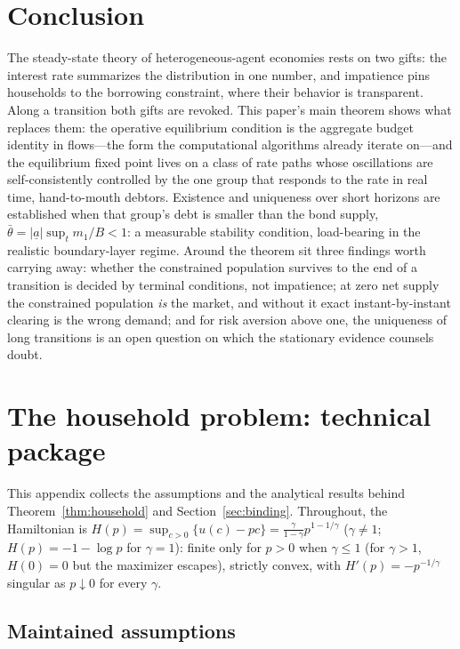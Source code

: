 \documentclass[11pt]{article}
\theoremstyle{definition}
\theoremstyle{remark}
\newcommand{\ubar}[1]{\underline{#1}}
\newcommand{\uba}{\ubar{a}}
\begin{document}
\section{Conclusion}
\label{sec:conclusion}

The steady-state theory of heterogeneous-agent economies rests on two
gifts: the interest rate summarizes the distribution in one number,
and impatience pins households to the borrowing constraint, where
their behavior is transparent. Along a transition both gifts are
revoked. This paper's main theorem shows what replaces them: the
operative equilibrium condition is the aggregate budget identity in
flows---the form the computational algorithms already iterate
on---and the equilibrium fixed point lives on a class of rate paths
whose oscillations are self-consistently controlled by the one group
that responds to the rate in real time, hand-to-mouth debtors.
Existence and uniqueness over short horizons are established when that
group's debt is smaller than the bond supply, $\bar\theta=|\uba|
\sup_tm_1/B<1$: a measurable stability condition, load-bearing in the
realistic boundary-layer regime. Around the theorem
sit three findings worth carrying away: whether the constrained
population survives to the end of a transition is decided by terminal
conditions, not impatience; at zero net supply the constrained
population \emph{is} the market, and without it exact
instant-by-instant clearing is the wrong demand; and for risk
aversion above one, the uniqueness of long transitions is an open
question on which the stationary evidence counsels doubt.

\appendix

\section{The household problem: technical package}
\label{app:household}

This appendix collects the assumptions and the analytical results
behind Theorem~\ref{thm:household} and
Section~\ref{sec:binding}. Throughout, the Hamiltonian is
$H(p)=\sup_{c>0}\{u(c)-pc\}=\frac{\gamma}{1-\gamma}p^{1-1/\gamma}$
($\gamma\ne1$; $H(p)=-1-\log p$ for $\gamma=1$): finite only for
$p>0$ when $\gamma\le1$ (for $\gamma>1$, $H(0)=0$ but the maximizer
escapes), strictly convex, with $H'(p)=-p^{-1/\gamma}$ singular as
$p\downarrow0$ for every $\gamma$.

\subsection{Maintained assumptions}
\end{document}
